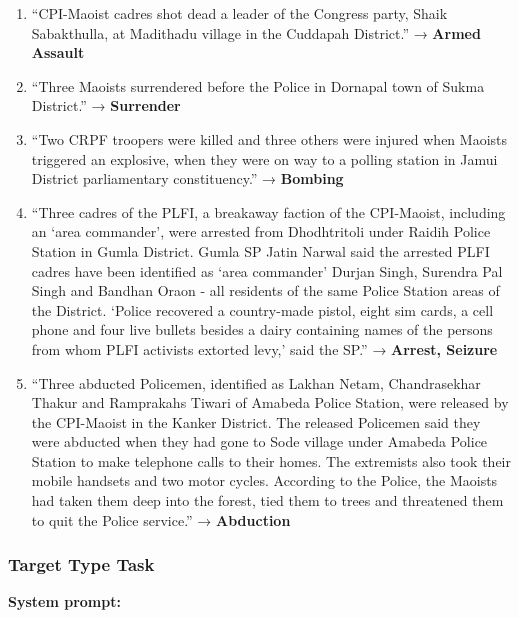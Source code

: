 \documentclass[
  11pt,
]{article}
\providecommand{\tightlist}{%
  \setlength{\itemsep}{0pt}\setlength{\parskip}{0pt}}
\begin{document}
\begin{enumerate}
\def\labelenumi{\arabic{enumi}.}
\tightlist
\item
  ``CPI-Maoist cadres shot dead a leader of the Congress party, Shaik
  Sabakthulla, at Madithadu village in the Cuddapah District.'' →
  \textbf{Armed Assault}
\item
  ``Three Maoists surrendered before the Police in Dornapal town of
  Sukma District.'' → \textbf{Surrender}
\item
  ``Two CRPF troopers were killed and three others were injured when
  Maoists triggered an explosive, when they were on way to a polling
  station in Jamui District parliamentary constituency.'' →
  \textbf{Bombing}
\item
  ``Three cadres of the PLFI, a breakaway faction of the CPI-Maoist,
  including an `area commander', were arrested from Dhodhtritoli under
  Raidih Police Station in Gumla District. Gumla SP Jatin Narwal said
  the arrested PLFI cadres have been identified as `area commander'
  Durjan Singh, Surendra Pal Singh and Bandhan Oraon - all residents of
  the same Police Station areas of the District. `Police recovered a
  country-made pistol, eight sim cards, a cell phone and four live
  bullets besides a dairy containing names of the persons from whom PLFI
  activists extorted levy,' said the SP.'' → \textbf{Arrest, Seizure}
\item
  ``Three abducted Policemen, identified as Lakhan Netam, Chandrasekhar
  Thakur and Ramprakahs Tiwari of Amabeda Police Station, were released
  by the CPI-Maoist in the Kanker District. The released Policemen said
  they were abducted when they had gone to Sode village under Amabeda
  Police Station to make telephone calls to their homes. The extremists
  also took their mobile handsets and two motor cycles. According to the
  Police, the Maoists had taken them deep into the forest, tied them to
  trees and threatened them to quit the Police service.'' →
  \textbf{Abduction}
\end{enumerate}

\subsubsection{Target Type Task}\label{target-type-task-1}

\textbf{System prompt:}
\end{document}
